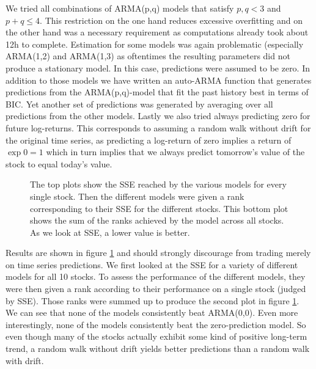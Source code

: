 We tried all combinations of ARMA(p,q) models that satisfy $p,q < 3$ and $p+q \leq 4$. This restriction on the one hand reduces excessive overfitting and on the other hand was a necessary requirement as computations already took about 12h to complete. Estimation for some models was again problematic (especially ARMA(1,2) and ARMA(1,3) as oftentimes the resulting parameters did not produce a stationary model. In this case, predictions were assumed to be zero. In addition to those models we have written an auto-ARMA function that generates predictions from the ARMA(p,q)-model that fit the past history best in terms of BIC. Yet another set of predictions was generated by averaging over all predictions from the other models. Lastly we also tried always predicting zero for future log-returns. This corresponds to assuming a random walk without drift for the original time series, as predicting a log-return of zero implies a return of $\exp{0} = 1$ which in turn implies that we always predict tomorrow's value of the stock to equal today's value. 

\begin{figure}[h!]
    \centering
    \begin{adjustbox}{width = 0.95\linewidth}
    
    \end{adjustbox}
    \vspace{1ex}
    \begin{adjustbox}{width = 0.95\linewidth}
    
    \end{adjustbox}
    \caption{The top plots show the SSE reached by the various models for every single stock. Then the different models were given a rank corresponding to their SSE for the different stocks. This bottom plot shows the sum of the ranks achieved by the model across all stocks. As we look at SSE, a lower value is better.}
    \label{fig:models_ranked}
\end{figure}{}


Results are shown in figure \ref{fig:models_ranked} and should strongly discourage from trading merely on time series predictions. We first looked at the SSE for a variety of different models for all 10 stocks. To assess the performance of the different models, they were then given a rank according to their performance on a single stock (judged by SSE). Those ranks were summed up to produce the second plot in figure \ref{fig:models_ranked}. We can see that none of the models consistently beat ARMA(0,0). Even more interestingly, none of the models consistently beat the zero-prediction model. So even though many of the stocks actually exhibit some kind of positive long-term trend, a random walk without drift yields better predictions than a random walk with drift. 


